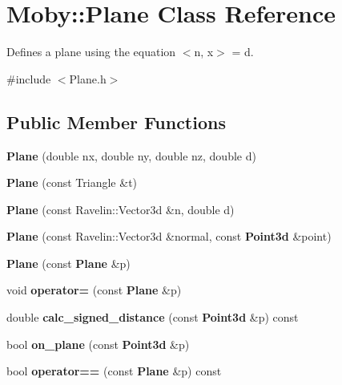 \section{Moby\-:\-:Plane Class Reference}
\label{classMoby_1_1Plane}


Defines a plane using the equation $<$n, x$>$ = d.  




{\ttfamily \#include $<$Plane.\-h$>$}

\subsection*{Public Member Functions}
\begin{DoxyCompactItemize}
\item 
{\bfseries Plane} (double nx, double ny, double nz, double d)\label{classMoby_1_1Plane_a37d5c13a0133d6c55eee5af96e16575b}

\item 
{\bfseries Plane} (const Triangle \&t)\label{classMoby_1_1Plane_ab4803d0bc581e56d2f5cf9c48e2a2044}

\item 
{\bfseries Plane} (const Ravelin\-::\-Vector3d \&n, double d)\label{classMoby_1_1Plane_a84f280d1d73658bf227357c6940797a9}

\item 
{\bfseries Plane} (const Ravelin\-::\-Vector3d \&normal, const {\bf Point3d} \&point)\label{classMoby_1_1Plane_a71722c6521f295bddf1d1924f43b0f30}

\item 
{\bfseries Plane} (const {\bf Plane} \&p)\label{classMoby_1_1Plane_a48ac08a469ed2e23012e155780bb4551}

\item 
void {\bfseries operator=} (const {\bf Plane} \&p)\label{classMoby_1_1Plane_a799034ea4bec6820f37e73fd43adad00}

\item 
double {\bfseries calc\-\_\-signed\-\_\-distance} (const {\bf Point3d} \&p) const \label{classMoby_1_1Plane_ab81f0d7cd2d017bd67424575135201b2}

\item 
bool {\bfseries on\-\_\-plane} (const {\bf Point3d} \&p)\label{classMoby_1_1Plane_a995274cd185b194bf5b9a951a2e41755}

\item 
bool {\bfseries operator==} (const {\bf Plane} \&p) const \label{classMoby_1_1Plane_a1286cb4e4ce40ec860a7a8323331286f}


\end{DoxyCompactItemize}
